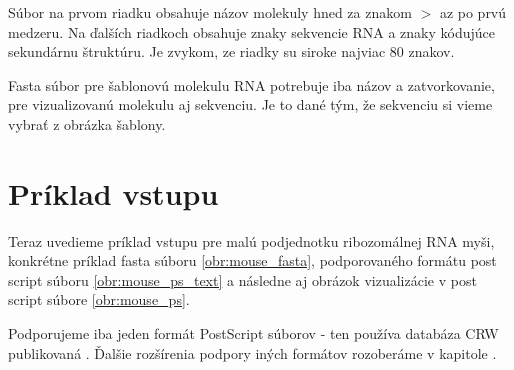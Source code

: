 Súbor na prvom riadku obsahuje názov molekuly hned za znakom $>$ az po prvú medzeru.
Na ďalších riadkoch obsahuje znaky sekvencie RNA a znaky kódujúce sekundárnu štruktúru.
Je zvykom, ze riadky su siroke najviac 80 znakov.

Fasta súbor pre šablonovú molekulu RNA potrebuje iba názov a zatvorkovanie, pre
vizualizovanú molekulu aj sekvenciu. Je to dané tým, že sekvenciu si vieme vybrať z obrázka šablony.

\section{Príklad vstupu}

Teraz uvedieme príklad vstupu pre malú podjednotku ribozomálnej RNA myši, konkrétne príklad
fasta súboru \ref{obr:mouse_fasta}, podporovaného formátu post script súboru \ref{obr:mouse_ps_text}
a následne aj obrázok vizualizácie v post script súbore \ref{obr:mouse_ps}.

\begin{pozn}
  Podporujeme iba jeden formát PostScript súborov - ten používa databáza CRW publikovaná \citet{CRW}.
  Ďalšie rozšírenia podpory iných formátov rozoberáme v kapitole .
\end{pozn}

